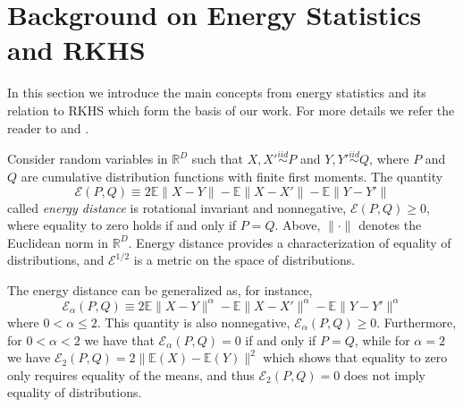 \documentclass[aps,preprint,nofootinbib,floatfix]{revtex4-1}
\newcommand\Energy{\mathcal{E}}
\newcommand\E{\mathbb{E}}
\begin{document}
\section{Background on Energy Statistics and RKHS}
\label{sec:background}

In this section we introduce the main concepts from energy
statistics and its relation to 
RKHS which form the basis of our work.
For more details we refer the reader
to \cite{Szkely2013} and \cite{Sejdinovic2013}.

Consider random variables in $\mathbb{R}^D$ 
such that $X,X' \stackrel{iid}{\sim} P$ and 
$Y,Y' \stackrel{iid}{\sim} Q$, where $P$ and $Q$ are cumulative
distribution functions with finite first moments. 
The quantity 
\begin{equation}
\label{eq:energy}
\Energy(P, Q) \equiv 2 \E \| X - Y\| - \E \| X - X' \| - \E \| Y - Y' \|
\end{equation}
called \emph{energy distance} \cite{Szkely2013} 
is rotational invariant and nonnegative, $\Energy(P,Q) \ge 0$, where
equality
to zero holds if and only if $P = Q$.
Above, $\| \cdot \|$ denotes the
Euclidean norm in $\mathbb{R}^D$. 
Energy distance
provides a characterization of equality of distributions, and
$\Energy^{1/2}$ is
a metric on the space of distributions.

The energy distance can be generalized as, for instance,
\begin{equation}
\label{eq:energy2}
\Energy_\alpha(P, Q) \equiv 
2 \E \| X - Y\|^{\alpha} - \E \| X - X' \|^{\alpha} - 
\E \| Y - Y' \|^{\alpha}
\end{equation}
where $0<\alpha\le 2$. This quantity is also nonnegative,
$\Energy_\alpha(P,Q) \ge 0$. Furthermore, for $0<\alpha<2$ we have that
$\Energy_\alpha(P,Q) = 0$ if and only if $P=Q$, while for $\alpha=2$ 
we have $\Energy_2(P,Q) = 2\| \E(X) - \E(Y) \|^2$ which shows that
equality to zero only requires
equality of the means, and thus $\Energy_2(P,Q)=0$ does 
not imply equality of distributions.
\end{document}
